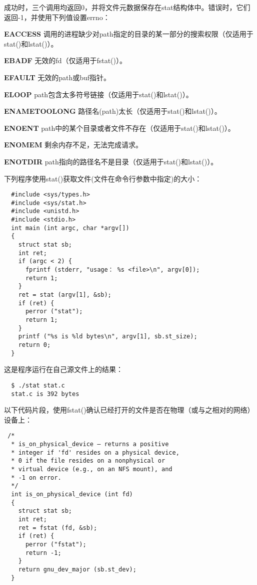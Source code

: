 成功时，三个调用均返回0，并将文件元数据保存在stat结构体中。错误时，它们返回-1，并使用下列值设置errno：

\begin{eqlist*}
\item[\textbf{EACCESS}] 调用的进程缺少对path指定的目录的某一部分的搜索权限（仅适用于stat()和lstat()）。
\item[\textbf{EBADF}] 无效的fd（仅适用于fstat()）。
\item[\textbf{EFAULT}] 无效的path或buf指针。
\item[\textbf{ELOOP}] path包含太多符号链接（仅适用于stat()和lstat()）。
\item[\textbf{ENAMETOOLONG}] 路径名(path)太长（仅适用于stat()和lstat()）。
\item[\textbf{ENOENT}] path中的某个目录或者文件不存在（仅适用于stat()和lstat()）。
\item[\textbf{ENOMEM}] 剩余内存不足，无法完成请求。
\item[\textbf{ENOTDIR}] path指向的路径名不是目录（仅适用于stat()和lstat()）。
\end{eqlist*}

下列程序使用stat()获取文件(文件在命令行参数中指定)的大小：

\begin{lstlisting}
  #include <sys/types.h>
  #include <sys/stat.h>
  #include <unistd.h>
  #include <stdio.h>
  int main (int argc, char *argv[])
  {
    struct stat sb;
    int ret;
    if (argc < 2) {
      fprintf (stderr, "usage： %s <file>\n", argv[0]);
      return 1;
    }
    ret = stat (argv[1], &sb);
    if (ret) {
      perror ("stat");
      return 1;
    }
    printf ("%s is %ld bytes\n", argv[1], sb.st_size);
    return 0;
  }
\end{lstlisting}

这是程序运行在自己源文件上的结果：

\begin{verbatim}
  $ ./stat stat.c
  stat.c is 392 bytes
\end{verbatim}

以下代码片段，使用fstat()确认已经打开的文件是否在物理（或与之相对的网络）设备上：

\begin{lstlisting}
 /*
  * is_on_physical_device – returns a positive
  * integer if 'fd' resides on a physical device,
  * 0 if the file resides on a nonphysical or
  * virtual device (e.g., on an NFS mount), and
  * -1 on error.
  */
  int is_on_physical_device (int fd)
  {
    struct stat sb;
    int ret;
    ret = fstat (fd, &sb);
    if (ret) {
      perror ("fstat");
      return -1;
    }
    return gnu_dev_major (sb.st_dev);
  }
\end{lstlisting}

